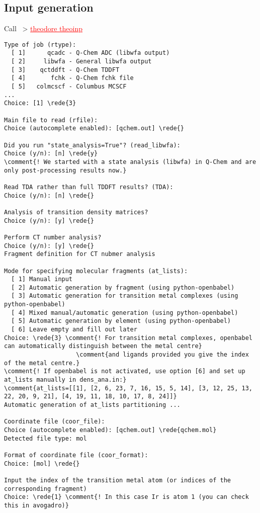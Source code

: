 \documentclass[DIV=12,headings=normal]{scrartcl}
\newcommand{\comment}[1]{\textcolor{blue}{#1}}
\newcommand{\redl}[1]{{\textcolor{red}{\underline{#1}}}}
\newcommand{\rede}[1]{\redl{#1 <ENTER>}}
\newcommand{\comm}[1]{
\small
~> \redl{#1}
\normalsize
}
\newcounter{number}
\begin{document}
\subsection{Input generation}
Call \comm{theodore theoinp}
\scriptsize
\begin{Verbatim}[commandchars=\\\{\}]
Type of job (rtype):
  [ 1]      qcadc - Q-Chem ADC (libwfa output)
  [ 2]     libwfa - General libwfa output
  [ 3]    qctddft - Q-Chem TDDFT
  [ 4]       fchk - Q-Chem fchk file
  [ 5]   colmcscf - Columbus MCSCF
...
Choice: [1] \rede{3}

Main file to read (rfile):
Choice (autocomplete enabled): [qchem.out] \rede{}

Did you run "state_analysis=True"? (read_libwfa):
Choice (y/n): [n] \rede{y}
\comment{! We started with a state analysis (libwfa) in Q-Chem and are only post-processing results now.}

Read TDA rather than full TDDFT results? (TDA):
Choice (y/n): [n] \rede{}

Analysis of transition density matrices?
Choice (y/n): [y] \rede{}

Perform CT number analysis?
Choice (y/n): [y] \rede{}
Fragment definition for CT nubmer analysis

Mode for specifying molecular fragments (at_lists):
  [ 1] Manual input
  [ 2] Automatic generation by fragment (using python-openbabel)
  [ 3] Automatic generation for transition metal complexes (using python-openbabel)
  [ 4] Mixed manual/automatic generation (using python-openbabel)
  [ 5] Automatic generation by element (using python-openbabel)
  [ 6] Leave empty and fill out later
Choice: \rede{3} \comment{! For transition metal complexes, openbabel can automatically distinguish between the metal centre} 
                    \comment{and ligands provided you give the index of the metal centre.}
\comment{! If openbabel is not activated, use option [6] and set up at_lists manually in dens_ana.in:}
\comment{at_lists=[[1], [2, 6, 23, 7, 16, 15, 5, 14], [3, 12, 25, 13, 22, 20, 9, 21], [4, 19, 11, 18, 10, 17, 8, 24]]}
Automatic generation of at_lists partitioning ...

Coordinate file (coor_file):
Choice (autocomplete enabled): [qchem.out] \rede{qchem.mol}
Detected file type: mol

Format of coordinate file (coor_format):
Choice: [mol] \rede{}

Input the index of the transition metal atom (or indices of the corresponding fragment)
Choice: \rede{1} \comment{! In this case Ir is atom 1 (you can check this in avogadro)}


\end{Verbatim}
\end{document}
